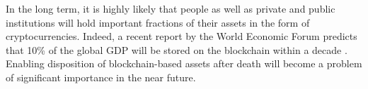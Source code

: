 In the long term, it is highly likely that people as well as private and public institutions will hold important fractions of their assets in the form of cryptocurrencies. Indeed, a recent report by the World Economic Forum predicts that 10\% of the global GDP will be stored on the blockchain within a decade \cite{WEF2017}.  
Enabling disposition of blockchain-based assets after death will become a problem of significant importance in the near future.




